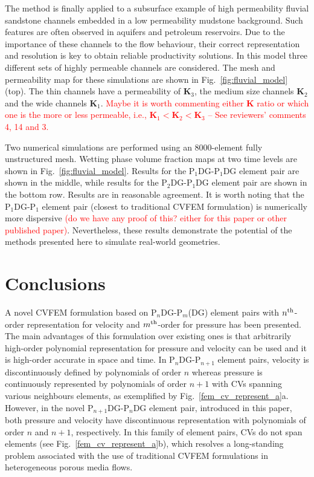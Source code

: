 \documentclass[times]{fldauth}
\newcommand{\PN}[2][error]{P$_{#1}$DG-P$_{#2}$}
\newcommand{\PNDG}[2][error]{P$_{#1}$DG-P$_{#2}$DG}
\newcommand{\red}{\textcolor{red}}
\begin{document}
The method is finally applied to a subsurface example of high
permeability fluvial sandstone channels embedded in a low permeability
mudstone background. Such features are often observed in aquifers and
petroleum reservoirs. Due to the importance of these channels to the
flow behaviour, their correct representation and resolution is key to
obtain reliable productivity solutions. In this model three different sets of
highly permeable channels are considered. The mesh and permeability
map for these simulations are shown in Fig.~\ref{fig:fluvial_model}
(top). The thin channels have a permeability of $\mathbf{K}_\text{3}$,
the medium size channels $\mathbf{K}_\text{2}$ and the wide channels
$\mathbf{K}_\text{1}$. \red{Maybe it is worth commenting either $\mathbf{K}$ ratio or which one is the more or less permeable, i.e., $\mathbf{K}_{1} < \mathbf{K}_{2} < \mathbf{K}_{3}$ -- See reviewers' comments 4, 14 and 3.}

Two numerical simulations are performed using an 8000-element fully
unstructured mesh. Wetting phase volume fraction maps at two time
levels are shown in Fig.~\ref{fig:fluvial_model}. Results for
the \PN[1]{1}DG element pair are shown in the middle, while results
for the \PN[2]{1}DG element pair are shown in the bottom row. Results
are in reasonable agreement. It is worth noting that the \PN[1]{1}
element pair (closest to traditional CVFEM formulation) is numerically
more dispersive \red{(do we have any proof of this? either for this paper or other published paper)}. Nevertheless, these results demonstrate the potential
of the methods presented here to simulate real-world geometries.



\section{Conclusions}\label{conc}

A novel CVFEM formulation based on \PN[n]{m}(DG) element pairs with $n^{\rm th}$-order representation for velocity and $m^{\rm th}$-order for pressure has been presented. The main advantages of this formulation over existing ones is that arbitrarily high-order polynomial representation for pressure and velocity can be used and it is high-order accurate in space and time. In \PN[n]{n+1} element pairs, velocity is discontinuously defined by polynomials of order $n$ whereas pressure is continuously represented by polynomials of order $n+1$ with CVs spanning various neighbours elements, as exemplified by Fig.~\ref{fem_cv_represent_a}a. However, in the novel \PNDG[n+1]{n} element pair, introduced in this paper, both pressure and velocity have discontinuous representation with polynomials of order $n$ and $n+1$, respectively. In this family of element pairs, CVs do not span elements (see Fig.~\ref{fem_cv_represent_a}b), which resolves a long-standing problem associated with the use of traditional CVFEM formulations in heterogeneous porous media flows.
\end{document}
